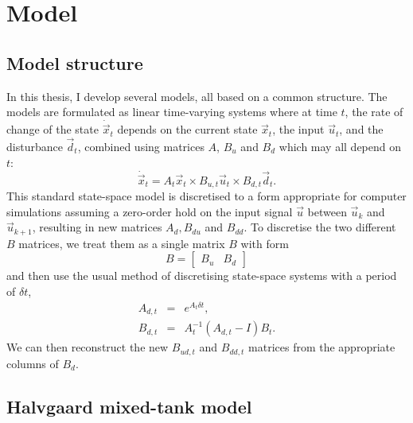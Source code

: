 \chapter{Model}

\section{Model structure}

In this thesis, I develop several models, all based on a common structure.
The models are formulated as linear time-varying systems where at time $t$, the rate of change of the state $\dot{\vec{x}}_t$ depends on the current state $\vec{x}_t$, the input $\vec{u}_t$, and the disturbance $\vec{d}_t$, combined using matrices $A$, $B_u$ and $B_d$ which may all depend on $t$:
\begin{equation}
	\dot{\vec{x}}_t = A_t \vec{x}_t \times B_{u, t} \vec{u}_t \times B_{d, t} \vec{d}_t.
	\label{eq:xdot}
\end{equation}
This standard state-space model is discretised to a form appropriate for computer simulations assuming a zero-order hold on the input signal $\vec{u}$ between $\vec{u}_k$ and $\vec{u}_{k+1}$, resulting in new matrices $A_d, B_{du}$ and $B_{dd}$.
To discretise the two different $B$ matrices, we treat them as a single matrix $B$ with form
\begin{displaymath}
	B = \left[\begin{array}{cc}
		B_u & B_d
	\end{array}\right]
\end{displaymath}
and then use the usual method of discretising state-space systems with a period of $\delta t$,
\begin{eqnarray}
	A_{d, t} &=& e^{A_t \delta t}, \\
	B_{d, t} &=& A_t^{-1} (A_{d, t} - I) B_t.
\end{eqnarray}
We can then reconstruct the new $B_{ud, t}$ and $B_{dd, t}$ matrices from the appropriate columns of $B_d$.

\section{Halvgaard mixed-tank model}
\label{sec:model:halvgaard}


